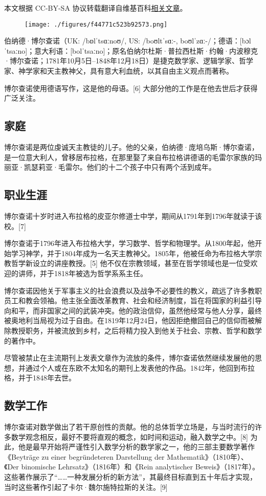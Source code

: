 
本文根据 CC-BY-SA 协议转载翻译自维基百科\href{https://en.wikipedia.org/wiki/Bernard_Bolzano}{相关文章}。

\begin{figure}[ht]
\centering
\texttt{[image: ./figures/f44771c523b92573.png]}
\caption{} \label{fig_Bolzan_1}
\end{figure}
伯纳德·博尔查诺（UK: /bɒlˈtsɑːnoʊ/, US: /boʊltˈsɑː-, boʊlˈzɑː-/；德语：[bɔlˈtsaːno]；意大利语：[bolˈtsaːno]；原名伯纳尔杜斯·普拉西杜斯·约翰·内波穆克·博尔查诺；1781年10月5日–1848年12月18日）是捷克数学家、逻辑学家、哲学家、神学家和天主教神父，具有意大利血统，以其自由主义观点而著称。

博尔查诺使用德语写作，这是他的母语。[6] 大部分他的工作是在他去世后才获得广泛关注。
\subsection{家庭}  
博尔查诺是两位虔诚天主教徒的儿子。他的父亲，伯纳德·庞培乌斯·博尔查诺，是一位意大利人，曾移居布拉格，在那里娶了来自布拉格讲德语的毛雷尔家族的玛丽亚·凯瑟莉亚·毛雷尔。他们的十二个孩子中只有两个活到成年。
\subsection{职业生涯}  
博尔查诺十岁时进入布拉格的皮亚尔修道士中学，期间从1791年到1796年就读于该校。[7]

博尔查诺于1796年进入布拉格大学，学习数学、哲学和物理学。从1800年起，他开始学习神学，并于1804年成为一名天主教神父。1805年，他被任命为布拉格大学宗教哲学新设立的讲座教授。[5] 他不仅在宗教领域，甚至在哲学领域也是一位受欢迎的讲师，并于1818年被选为哲学系系主任。

博尔查诺因他关于军事主义的社会浪费以及战争不必要性的教义，疏远了许多教职员工和教会领袖。他主张全面改革教育、社会和经济制度，旨在将国家的利益引导向和平，而非国家之间的武装冲突。他的政治信仰，虽然他经常与他人分享，最终被奥地利当局视为过于自由。在1819年12月24日，他因拒绝撤回自己的信仰而被解除教授职务，并被流放到乡村，之后将精力投入到他关于社会、宗教、哲学和数学的著作中。

尽管被禁止在主流期刊上发表文章作为流放的条件，博尔查诺依然继续发展他的思想，并通过个人或在东欧不太知名的期刊上发表他的作品。1842年，他回到布拉格，并于1848年去世。
\subsection{数学工作}  
博尔查诺对数学做出了若干原创性的贡献。他的总体哲学立场是，与当时流行的许多数学观念相反，最好不要将直观的概念，如时间和运动，融入数学之中。[8] 为此，他是最早开始将严谨性引入数学分析的数学家之一，他的三部主要数学著作《Beyträge zu einer begründeteren Darstellung der Mathematik》（1810年）、《Der binomische Lehrsatz》（1816年）和《Rein analytischer Beweis》（1817年）。这些著作展示了“……一种发展分析的新方法”，其最终目标直到五十年后才实现，当时这些著作引起了卡尔·魏尔施特拉斯的关注。[9]

